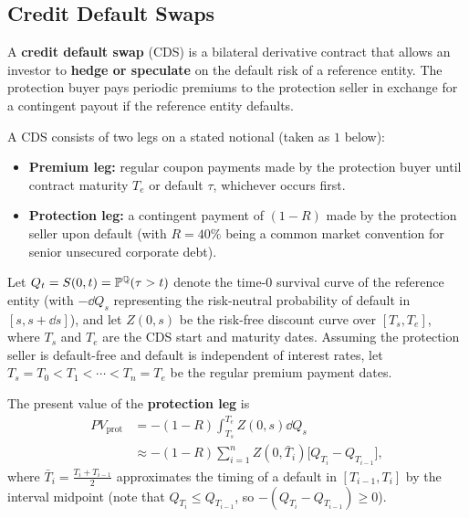 \subsection*{Credit Default Swaps}
\begin{definition}\label{def:cds}
    A \textbf{credit default swap} (CDS) is a bilateral derivative contract that allows an investor to \textbf{hedge or speculate} on the default risk of a reference entity. The protection buyer pays periodic premiums to the protection seller in exchange for a contingent payout if the reference entity defaults.
\end{definition}

A CDS consists of two legs on a stated notional (taken as $1$ below):
\begin{itemize}
    \item \textbf{Premium leg:} regular coupon payments made by the protection buyer until contract maturity $T_e$ or default $\tau$, whichever occurs first.
    \item \textbf{Protection leg:} a contingent payment of $(1 - R)$ made by the protection seller upon default (with $R = 40\%$ being a common market convention for senior unsecured corporate debt).
\end{itemize}

Let $Q_t = S(0, t) = \mathbb{P}^{\mathbb{Q}}(\tau > t)$ denote the time-$0$ survival curve of the reference entity (with $-\dd Q_s$ representing the risk-neutral probability of default in $[s, s+\dd s]$), and let $Z(0, s)$ be the risk-free discount curve over $[T_s, T_e]$, where $T_s$ and $T_e$ are the CDS start and maturity dates. Assuming the protection seller is default-free and default is independent of interest rates, let $T_s = T_0 < T_1 < \cdots < T_n = T_e$ be the regular premium payment dates.

The present value of the \textbf{protection leg} is
\begin{align*}
PV_{\text{prot}} &= -(1 - R)\int_{T_s}^{T_e} Z(0, s)\dd Q_s \\
&\approx -(1 - R)\sum_{i=1}^n Z(0, \bar{T}_i)\bigl[Q_{T_i} - Q_{T_{i-1}}\bigr],
\end{align*}
where $\bar{T}_i = \frac{T_i + T_{i-1}}{2}$ approximates the timing of a default in $[T_{i-1}, T_i]$ by the interval midpoint (note that $Q_{T_i} \leq Q_{T_{i-1}}$, so $-(Q_{T_i} - Q_{T_{i-1}}) \geq 0$).

